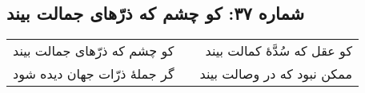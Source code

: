 \begin{center}
\section*{شماره ۳۷: کو چشم که ذرّهای جمالت بیند}
\label{sec:037}
\begin{longtable}{l p{0.5cm} r}
کو چشم که ذرّهای جمالت بیند
&&
کو عقل که سُدَّهٔ کمالت بیند
\\
گر جملهٔ ذرّات جهان دیده شود
&&
ممکن نبود که در وصالت بیند
\\
\end{longtable}
\end{center}
